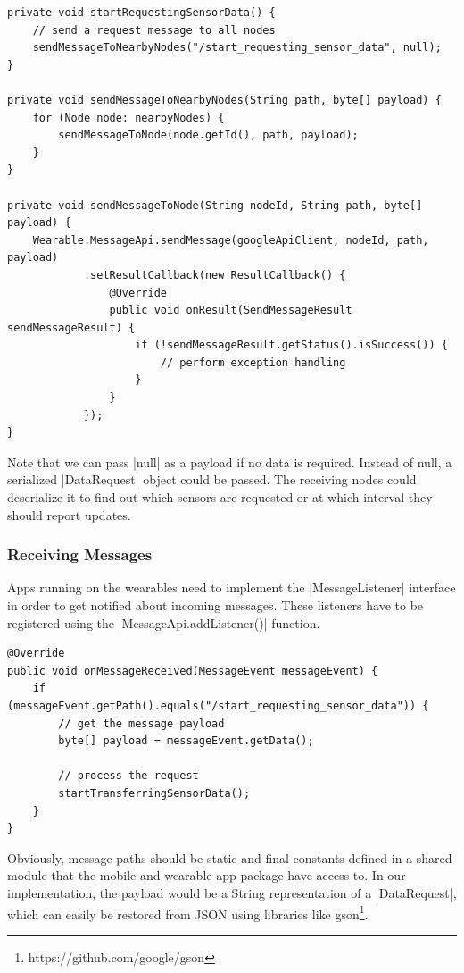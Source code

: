\begin{lstlisting}[label=sendmessage]
private void startRequestingSensorData() {
	// send a request message to all nodes
	sendMessageToNearbyNodes("/start_requesting_sensor_data", null);
}

private void sendMessageToNearbyNodes(String path, byte[] payload) {
	for (Node node: nearbyNodes) {
		sendMessageToNode(node.getId(), path, payload);
	}
}

private void sendMessageToNode(String nodeId, String path, byte[] payload) {
	Wearable.MessageApi.sendMessage(googleApiClient, nodeId, path, payload)
			.setResultCallback(new ResultCallback() {
				@Override
				public void onResult(SendMessageResult sendMessageResult) {
					if (!sendMessageResult.getStatus().isSuccess()) {
						// perform exception handling
					}
				}
			});
}
\end{lstlisting}

Note that we can pass |null| as a payload if no data is required.
Instead of null, a serialized |DataRequest|\cite{sensordatalogger:datarequest} object could be passed.
The receiving nodes could deserialize it to find out which sensors are requested or at which interval they should report updates.

\subsubsection{Receiving Messages}

Apps running on the wearables need to implement the |MessageListener|\cite{androiddocs:messagelistener} interface in order to get notified about incoming messages. These listeners have to be registered using the |MessageApi.addListener()| function.

\begin{lstlisting}[label=receivemessage]
@Override
public void onMessageReceived(MessageEvent messageEvent) {
    if (messageEvent.getPath().equals("/start_requesting_sensor_data")) {
        // get the message payload
        byte[] payload = messageEvent.getData();

        // process the request
        startTransferringSensorData();
    }
}
\end{lstlisting}

Obviously, message paths should be static and final constants defined in a shared module that the mobile and wearable app package have access to. In our implementation, the payload would be a String representation of a |DataRequest|, which can easily be restored from JSON using libraries like gson\footnote{https://github.com/google/gson}.

